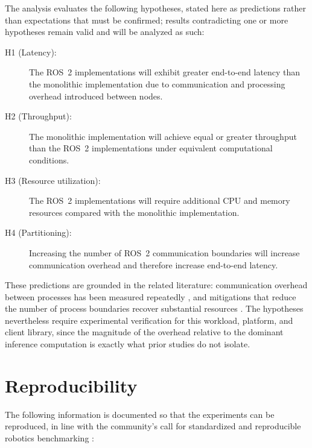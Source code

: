 The analysis evaluates the following hypotheses, stated here as
predictions rather than expectations that must be confirmed; results
contradicting one or more hypotheses remain valid and will be analyzed as
such:

\begin{description}
  \item[H1 (Latency):] The ROS~2 implementations will exhibit greater
        end-to-end latency than the monolithic implementation due to
        communication and processing overhead introduced between nodes.
  \item[H2 (Throughput):] The monolithic implementation will achieve equal
        or greater throughput than the ROS~2 implementations under
        equivalent computational conditions.
  \item[H3 (Resource utilization):] The ROS~2 implementations will
        require additional CPU and memory resources compared with the
        monolithic implementation.
  \item[H4 (Partitioning):] Increasing the number of ROS~2 communication
        boundaries will increase communication overhead and therefore
        increase end-to-end latency.
\end{description}

These predictions are grounded in the related literature: communication
overhead between processes has been measured repeatedly
\cite{kronauer2021, macenski2022, kamiya2025}, and mitigations that
reduce the number of process boundaries recover substantial resources
\cite{macenski2023}. The hypotheses nevertheless require experimental
verification for this workload, platform, and client library, since the
magnitude of the overhead relative to the dominant inference computation
is exactly what prior studies do not isolate.

\section{Reproducibility}
\label{sec:reproducibility}

The following information is documented so that the experiments can be
reproduced, in line with the community's call for standardized and
reproducible robotics benchmarking \cite{mayoral-vilches2024}:

